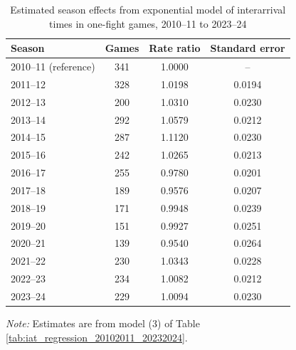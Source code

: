 \begin{table}[!h]
\centering
\caption{Estimated season effects from exponential model of interarrival times in one-fight games, 2010--11 to 2023--24}
\label{tab:season_effects_20102011_20232024}
\small
\renewcommand{\arraystretch}{1.12}
\setlength{\tabcolsep}{6pt}

\begin{tabular*}{0.75\textwidth}{@{\extracolsep{\fill}}lccc}
\toprule
Season & Games & Rate ratio & Standard error \\
\midrule
2010--11 (reference) & 341 & 1.0000 & -- \\
2011--12 & 328 & 1.0198 & 0.0194 \\
2012--13 & 200 & 1.0310 & 0.0230 \\
2013--14 & 292 & 1.0579 & 0.0212 \\
2014--15 & 287 & 1.1120 & 0.0230 \\
2015--16 & 242 & 1.0265 & 0.0213 \\
2016--17 & 255 & 0.9780 & 0.0201 \\
2017--18 & 189 & 0.9576 & 0.0207 \\
2018--19 & 171 & 0.9948 & 0.0239 \\
2019--20 & 151 & 0.9927 & 0.0251 \\
2020--21 & 139 & 0.9540 & 0.0264 \\
2021--22 & 230 & 1.0343 & 0.0228 \\
2022--23 & 234 & 1.0082 & 0.0212 \\
2023--24 & 229 & 1.0094 & 0.0230 \\
\bottomrule
\end{tabular*}

\vspace{0.4em}
\parbox{0.75\textwidth}{
\footnotesize
\textit{Note:} Estimates are from model (3) of Table \ref{tab:iat_regression_20102011_20232024}.
}
\end{table}
